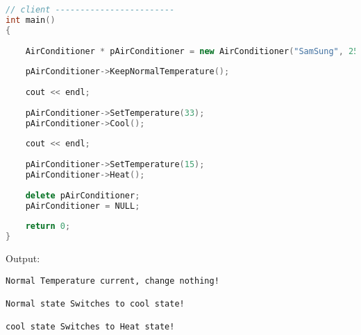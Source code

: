 \documentclass{book}
\begin{document}
\begin{lstlisting}[caption={State Pattern exmaple 1}, language=C++]
// client ------------------------
int main()  
{  
  
    AirConditioner * pAirConditioner = new AirConditioner("SamSung", 25);  
  
    pAirConditioner->KeepNormalTemperature();  
  
    cout << endl;  
      
    pAirConditioner->SetTemperature(33);  
    pAirConditioner->Cool();  
  
    cout << endl;  
  
    pAirConditioner->SetTemperature(15);  
    pAirConditioner->Heat();  
  
    delete pAirConditioner;  
    pAirConditioner = NULL;  
  
    return 0;  
}  
\end{lstlisting}
Output:
\begin{verbatim}
Normal Temperature current, change nothing!

Normal state Switches to cool state!

cool state Switches to Heat state!
\end{verbatim}
\end{document}
